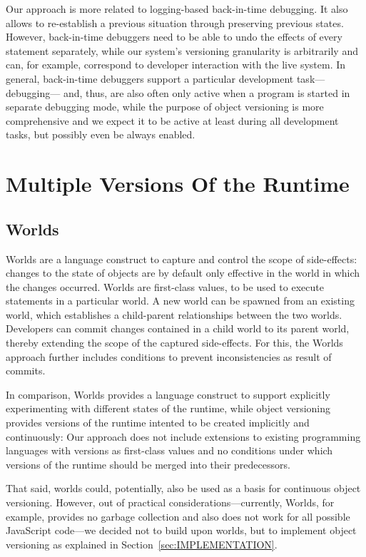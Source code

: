 Our approach is more related to logging-based back-in-time debugging.
It also allows to re-establish a previous situation through preserving previous states.
However, back-in-time debuggers need to be able to undo the effects of every statement separately, while our system's versioning granularity is arbitrarily and can, for example, correspond to developer interaction with the live system.
In general, back-in-time debuggers support a particular development task---debugging--- and, thus, are also often only active when a program is started in separate debugging mode, while the purpose of object versioning is more comprehensive and we expect it to be active at least during all development tasks, but possibly even be always enabled.


\section{Multiple Versions Of the Runtime}


\subsection{Worlds}

Worlds are a language construct to capture and control the scope of side-effects: changes to the state of objects are by default only effective in the world in which the changes occurred.
Worlds are first-class values, to be used to execute statements in a particular world.
A new world can be spawned from an existing world, which establishes a child-parent relationships between the two worlds.
Developers can commit changes contained in a child world to its parent world, thereby extending the scope of the captured side-effects.
For this, the Worlds approach further includes conditions to prevent inconsistencies as result of commits.

In comparison, Worlds provides a language construct to support explicitly experimenting with different states of the runtime, while object versioning provides versions of the runtime intented to be created implicitly and continuously: Our approach does not include extensions to existing programming languages with versions as first-class values and no conditions under which versions of the runtime should be merged into their predecessors.

That said, worlds could, potentially, also be used as a basis for continuous object versioning.
However, out of practical considerations---currently, Worlds, for example, provides no garbage collection and also does not work for all possible JavaScript code---we decided not to build upon worlds, but to implement object versioning as explained in Section~\ref{sec:IMPLEMENTATION}.



